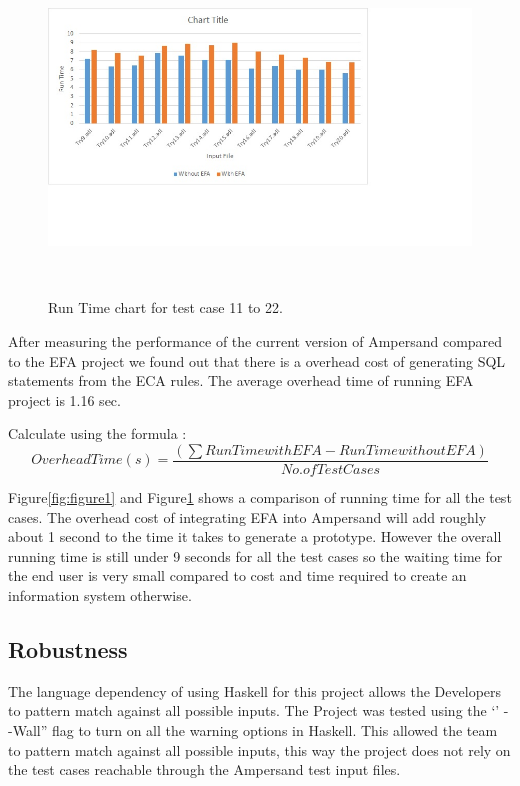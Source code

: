 \documentclass[12pt, svgnames]{article}
\begin{document}
\begin{figure}
  \centering
    \includegraphics[width=1.3\textwidth]{Chart2}
\caption{Run Time chart for test case 11 to 22.}~\label{fig:figure2}
\end{figure}

After measuring the performance of the current version of Ampersand compared to the EFA project we found out that there is a overhead cost of generating SQL statements from the ECA rules. The average overhead time of running EFA project is 1.16 sec. 

Calculate using the formula : 
\begin{equation}
	Overhead Time(s) =\frac{\left ( \sum  Run Time with EFA - Run Time without EFA\right )}{ No. of Test Cases}
\end{equation}

Figure\ref{fig:figure1} and Figure\ref{fig:figure2} shows a comparison of running time for all the test cases. The overhead cost of integrating EFA into Ampersand will add roughly about 1 second to the time it takes to generate a prototype. However the overall running time is still under 9 seconds for all the test cases so the waiting time for the end user is very small compared to cost and time required to create an information system otherwise.

\subsection{Robustness}
The language dependency of using Haskell for this project allows the Developers to pattern match against all possible inputs. The Project was tested using the `' - -Wall'' flag to turn on all the warning options in Haskell. This allowed the team to pattern match against all possible inputs, this way the project does not rely on the test cases reachable through the Ampersand test input files. 
\end{document}
